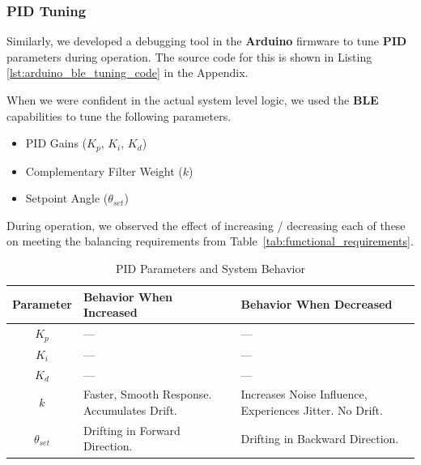 \documentclass{article}
\begin{document}
\subsubsection{PID Tuning}

\begin{minipage}{\linewidth}
    Similarly, we developed a debugging tool in the \textbf{Arduino} firmware to tune \textbf{PID} parameters during operation.
    The source code for this is shown in Listing \ref{lst:arduino_ble_tuning_code} in the Appendix. \\
\end{minipage}

\begin{minipage}{\linewidth}
    When we were confident in the actual system level logic, we used the \textbf{BLE} capabilities to tune the following parameters. \\
\end{minipage}

\begin{itemize}
    \item PID Gains ($K_p$, $K_i$, $K_d$)
    \item Complementary Filter Weight ($k$)
    \item Setpoint Angle ($\theta_{set}$)
\end{itemize}

\begin{minipage}{\linewidth}
    During operation, we observed the effect of increasing / decreasing each of these on meeting the balancing requirements from
    Table~\ref{tab:functional_requirements}. \\
\end{minipage}

\begin{table}[H]
    \centering
    \renewcommand{\arraystretch}{1.3}
    \begin{tabularx}{\textwidth}{|c|X|X|}
        \hline
        \textbf{Parameter} & \textbf{Behavior When Increased} & \textbf{Behavior When Decreased} \\
        \hline
        $K_p$ & --- & --- \\
        \hline
        $K_i$ & --- & --- \\
        \hline
        $K_d$ & --- & --- \\
        \hline
        $k$ & Faster, Smooth Response. Accumulates Drift. & Increases Noise Influence, Experiences Jitter. No Drift. \\
        \hline
        $\theta_{set}$ & Drifting in Forward Direction. & Drifting in Backward Direction. \\
        \hline
    \end{tabularx}
    \caption{PID Parameters and System Behavior}
    \label{tab:parameter_behavior}
\end{table}
\end{document}
